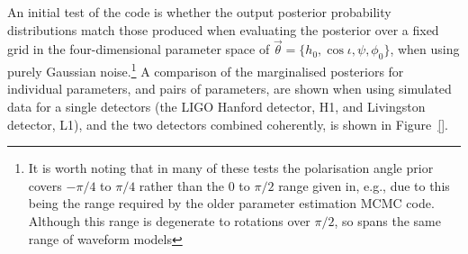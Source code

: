 An initial test of the code is whether the output posterior probability distributions match those produced when evaluating the
posterior over a fixed grid in the four-dimensional parameter space of $\vec{\theta} = \{h_0, \cos{\iota}, \psi, \phi_0\}$, when
using purely Gaussian noise.\footnote{It is worth noting that in many of these tests the polarisation angle prior covers $-\pi/4$ to $\pi/4$
rather than the 0 to $\pi/2$ range given in, e.g., \citet{2015MNRAS.453.4399P} due to this being the range required by the older
parameter estimation MCMC code. Although this range is degenerate to rotations over $\pi/2$, so spans the same range of waveform models}
A comparison of the marginalised posteriors for individual parameters, and pairs of parameters, are shown when using simulated data for
a single detectors (the LIGO Hanford detector, H1, and Livingston detector, L1), and the two detectors combined coherently, is shown
in Figure~\ref{}.
